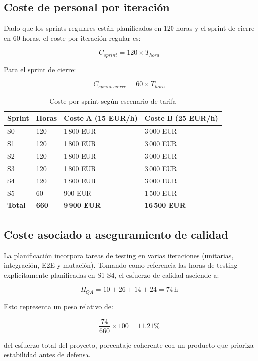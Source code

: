 \subsection{Coste de personal por iteraci\'on}

Dado que los sprints regulares est\'an planificados en 120 horas y el sprint de cierre en 60 horas,
el coste por iteraci\'on regular es:

\[
C_{sprint} = 120 \times T_{hora}
\]


Para el sprint de cierre:

\[
C_{sprint\_cierre} = 60 \times T_{hora}
\]
\begin{table}[!htbp]
\centering
\begin{tabular}{|P{2cm}|P{2.2cm}|P{3.3cm}|P{3.3cm}|}
\hline
\textbf{Sprint} & \textbf{Horas} & \textbf{Coste A (15 EUR/h)} & \textbf{Coste B (25 EUR/h)} \\
\hline
S0 & 120 & 1\,800 EUR & 3\,000 EUR \\
\hline
S1 & 120 & 1\,800 EUR & 3\,000 EUR \\
\hline
S2 & 120 & 1\,800 EUR & 3\,000 EUR \\
\hline
S3 & 120 & 1\,800 EUR & 3\,000 EUR \\
\hline
S4 & 120 & 1\,800 EUR & 3\,000 EUR \\
\hline
S5 & 60 & 900 EUR & 1\,500 EUR \\
\hline
\textbf{Total} & \textbf{660} & \textbf{9\,900 EUR} & \textbf{16\,500 EUR} \\
\hline
\end{tabular}
\caption{Coste por sprint seg\'un escenario de tarifa}
\label{tab:coste-por-sprint}
\end{table}

\subsection{Coste asociado a aseguramiento de calidad}

La planificaci\'on incorpora tareas de testing en varias iteraciones
(unitarias, integraci\'on, E2E y mutaci\'on).
Tomando como referencia las horas de testing expl\'icitamente planificadas
en S1-S4, el esfuerzo de calidad asciende a:

\[
H_{QA} = 10 + 26 + 14 + 24 = 74\ \text{h}
\]

Esto representa un peso relativo de:

\[
\frac{74}{660} \times 100 = 11.21\%
\]

del esfuerzo total del proyecto, porcentaje coherente con un producto
que prioriza estabilidad antes de defensa.

